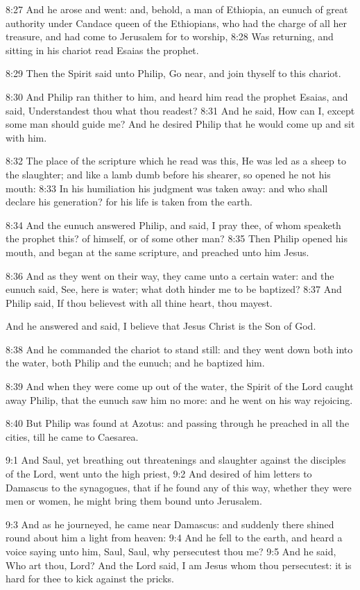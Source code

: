 8:27 And he arose and went: and, behold, a man of Ethiopia, an eunuch of great authority under Candace queen of the Ethiopians, who had the charge of all her treasure, and had come to Jerusalem for to worship, 8:28 Was returning, and sitting in his chariot read Esaias the prophet.

8:29 Then the Spirit said unto Philip, Go near, and join thyself to this chariot.

8:30 And Philip ran thither to him, and heard him read the prophet Esaias, and said, Understandest thou what thou readest?  8:31 And he said, How can I, except some man should guide me? And he desired Philip that he would come up and sit with him.

8:32 The place of the scripture which he read was this, He was led as a sheep to the slaughter; and like a lamb dumb before his shearer, so opened he not his mouth: 8:33 In his humiliation his judgment was taken away: and who shall declare his generation? for his life is taken from the earth.

8:34 And the eunuch answered Philip, and said, I pray thee, of whom speaketh the prophet this? of himself, or of some other man?  8:35 Then Philip opened his mouth, and began at the same scripture, and preached unto him Jesus.

8:36 And as they went on their way, they came unto a certain water: and the eunuch said, See, here is water; what doth hinder me to be baptized?  8:37 And Philip said, If thou believest with all thine heart, thou mayest.

And he answered and said, I believe that Jesus Christ is the Son of God.

8:38 And he commanded the chariot to stand still: and they went down both into the water, both Philip and the eunuch; and he baptized him.

8:39 And when they were come up out of the water, the Spirit of the Lord caught away Philip, that the eunuch saw him no more: and he went on his way rejoicing.

8:40 But Philip was found at Azotus: and passing through he preached in all the cities, till he came to Caesarea.

9:1 And Saul, yet breathing out threatenings and slaughter against the disciples of the Lord, went unto the high priest, 9:2 And desired of him letters to Damascus to the synagogues, that if he found any of this way, whether they were men or women, he might bring them bound unto Jerusalem.

9:3 And as he journeyed, he came near Damascus: and suddenly there shined round about him a light from heaven: 9:4 And he fell to the earth, and heard a voice saying unto him, Saul, Saul, why persecutest thou me?  9:5 And he said, Who art thou, Lord? And the Lord said, I am Jesus whom thou persecutest: it is hard for thee to kick against the pricks.

